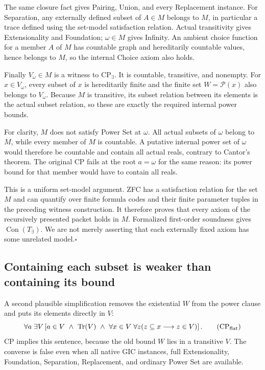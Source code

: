 The same closure fact gives Pairing, Union, and every Replacement instance.
For Separation, any externally defined subset of $A\in M$ belongs to $M$,
in particular a trace defined using the set-model satisfaction relation.
Actual transitivity gives Extensionality and Foundation; $\omega\in M$
gives Infinity.  An ambient choice function for a member $A$ of $M$ has
countable graph and hereditarily countable values, hence belongs to $M$,
so the internal Choice axiom also holds.

Finally $V_\omega\in M$ is a witness to $\mathrm{CP}_{\exists}$.
It is countable, transitive, and nonempty.  For $x\in V_\omega$, every
subset of $x$ is hereditarily finite and the finite set
$W=\mathcal P(x)$ also belongs to $V_\omega$.  Because $M$ is transitive,
its subset relation between its elements is the actual subset relation,
so these are exactly the required internal power bounds.

For clarity, $M$ does not satisfy Power Set at $\omega$.  All actual
subsets of $\omega$ belong to $M$, while every member of $M$ is
countable.  A putative internal power set of $\omega$ would therefore
be countable and contain all actual reals, contrary to Cantor's theorem.
The original CP fails at the root $a=\omega$ for the same reason: its
power bound for that member would have to contain all reals.

This is a uniform set-model argument.  ZFC has a satisfaction relation
for the set $M$ and can quantify over finite formula codes and their
finite parameter tuples in the preceding witness construction.  It
therefore proves that every axiom of the recursively presented packet
holds in $M$.  Formalized first-order soundness gives
$\operatorname{Con}(T_{\exists})$.  We are not merely asserting that
each externally fixed axiom has some unrelated model.\hfill$\square$

\subsection{Containing each subset is weaker than containing its bound}

A second plausible simplification removes the existential $W$ from the
power clause and puts its elements directly in $V$:
\begin{equation}
\forall a\;\exists V\left[
 a\in V\ \land\ \operatorname{Tr}(V)\ \land\
 \forall x\in V\;\forall z
       (z\subseteq x\longrightarrow z\in V)\right].
\tag{CP$_{\mathrm{flat}}$}\label{eq:filter-flat}
\end{equation}
CP implies this sentence, because the old bound $W$ lies in a transitive
$V$.  The converse is false even when all native GIC instances, full
Extensionality, Foundation, Separation, Replacement, and ordinary Power
Set are available.

